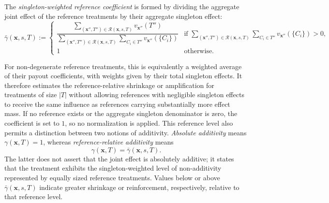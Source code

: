 The \emph{singleton-weighted reference coefficient} is formed by dividing the
aggregate joint effect of the reference treatments by their aggregate singleton
effect:
\begin{equation}
	\label{eq:gamma_bar}
	\bar\gamma(\mathbf{x},s,T) :=
	\begin{cases}
		\dfrac{\displaystyle\sum_{(\mathbf{x}'',T'')\in\mathcal{R}(\mathbf{x},s,T)}v_{\mathbf{x}''}(T'')}
		{\displaystyle\sum_{(\mathbf{x}'',T'')\in\mathcal{R}(\mathbf{x},s,T)}\sum_{C_i\in T''}v_{\mathbf{x}''}(\{C_i\})}
		  & \text{if } \displaystyle\sum_{(\mathbf{x}'',T'')\in\mathcal{R}(\mathbf{x},s,T)}\sum_{C_i\in T''}v_{\mathbf{x}''}(\{C_i\}) > 0, \\[20pt]
		1 & \text{otherwise}.
	\end{cases}
\end{equation}

For non-degenerate reference treatments, this is equivalently a weighted average
of their payout coefficients, with weights given by their total singleton effects.
It therefore estimates the reference-relative shrinkage or amplification for
treatments of size $|T|$ without allowing references with negligible singleton
effects to receive the same influence as references carrying substantially more
effect mass. If no reference exists or the aggregate singleton denominator is
zero, the coefficient is set to $1$, so no normalization is applied. This
reference level also permits a distinction between two notions of additivity.
\emph{Absolute additivity} means $\gamma(\mathbf{x},T)=1$, whereas
\emph{reference-relative additivity} means
\begin{equation}
	\gamma(\mathbf{x},T)=\bar\gamma(\mathbf{x},s,T).
\end{equation}
The latter does not assert that the joint effect is absolutely additive; it states that the treatment exhibits the singleton-weighted level of non-additivity represented by equally sized reference treatments. Values below or above $\bar\gamma(\mathbf{x},s,T)$ indicate greater shrinkage or reinforcement, respectively, relative to that reference level.

